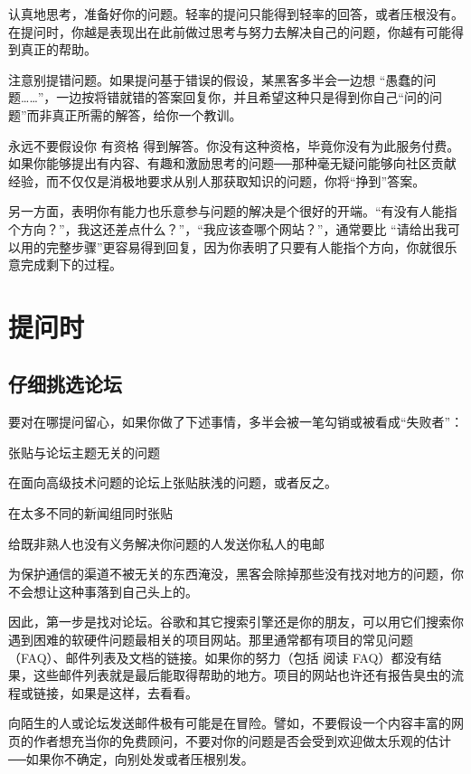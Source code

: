 认真地思考，准备好你的问题。轻率的提问只能得到轻率的回答，或者压根没有。在提问时，你越是表现出在此前做过思考与努力去解决自己的问题，你越有可能得到真正的帮助。

注意别提错问题。如果提问基于错误的假设，某黑客多半会一边想 “愚蠢的问题……”，一边按将错就错的答案回复你，并且希望这种只是得到你自己“问的问题”而非真正所需的解答，给你一个教训。

永远不要假设你 有资格 得到解答。你没有这种资格，毕竟你没有为此服务付费。如果你能够提出有内容、有趣和激励思考的问题──那种毫无疑问能够向社区贡献经验，而不仅仅是消极地要求从别人那获取知识的问题，你将“挣到”答案。

另一方面，表明你有能力也乐意参与问题的解决是个很好的开端。“有没有人能指个方向？”，我这还差点什么？”，“我应该查哪个网站？”，通常要比 “请给出我可以用的完整步骤”更容易得到回复，因为你表明了只要有人能指个方向，你就很乐意完成剩下的过程。




\section{提问时}


\subsection{仔细挑选论坛}

要对在哪提问留心，如果你做了下述事情，多半会被一笔勾销或被看成“失败者”：


\begin{compactenum}
\item 张贴与论坛主题无关的问题
\item 在面向高级技术问题的论坛上张贴肤浅的问题，或者反之。
\item 在太多不同的新闻组同时张贴
\item 给既非熟人也没有义务解决你问题的人发送你私人的电邮
\end{compactenum}



为保护通信的渠道不被无关的东西淹没，黑客会除掉那些没有找对地方的问题，你不会想让这种事落到自己头上的。

因此，第一步是找对论坛。谷歌和其它搜索引擎还是你的朋友，可以用它们搜索你遇到困难的软硬件问题最相关的项目网站。那里通常都有项目的常见问题（FAQ）、邮件列表及文档的链接。如果你的努力（包括 阅读 FAQ）都没有结果，这些邮件列表就是最后能取得帮助的地方。项目的网站也许还有报告臭虫的流程或链接，如果是这样，去看看。

向陌生的人或论坛发送邮件极有可能是在冒险。譬如，不要假设一个内容丰富的网页的作者想充当你的免费顾问，不要对你的问题是否会受到欢迎做太乐观的估计──如果你不确定，向别处发或者压根别发。

